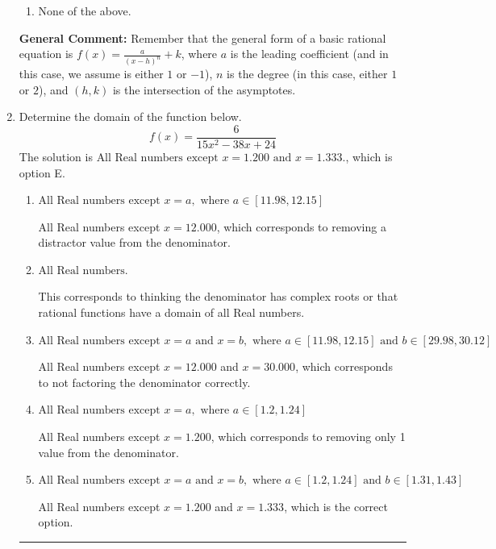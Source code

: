 \documentclass{extbook}[14pt]
\newcommand{\litem}[1]{\item #1

\rule{\textwidth}{0.4pt}}
\begin{document}
\begin{enumerate}
{\begin{enumerate}[label=\Alph*.]
\item None of the above.\end{enumerate}
\textbf{General Comment:} Remember that the general form of a basic rational equation is $ f(x) = \frac{a}{(x-h)^n} + k$, where $a$ is the leading coefficient (and in this case, we assume is either $1$ or $-1$), $n$ is the degree (in this case, either $1$ or $2$), and $(h, k)$ is the intersection of the asymptotes.
}
\litem{
Determine the domain of the function below.
\[ f(x) = \frac{6}{15x^{2} -38 x + 24} \]The solution is \( \text{All Real numbers except } x = 1.200 \text{ and } x = 1.333. \), which is option E.\begin{enumerate}[label=\Alph*.]
\item \( \text{All Real numbers except } x = a, \text{ where } a \in [11.98, 12.15] \)

All Real numbers except $x = 12.000$, which corresponds to removing a distractor value from the denominator.
\item \( \text{All Real numbers.} \)

This corresponds to thinking the denominator has complex roots or that rational functions have a domain of all Real numbers.
\item \( \text{All Real numbers except } x = a \text{ and } x = b, \text{ where } a \in [11.98, 12.15] \text{ and } b \in [29.98, 30.12] \)

All Real numbers except $x = 12.000$ and $x = 30.000$, which corresponds to not factoring the denominator correctly.
\item \( \text{All Real numbers except } x = a, \text{ where } a \in [1.2, 1.24] \)

All Real numbers except $x = 1.200$, which corresponds to removing only 1 value from the denominator.
\item \( \text{All Real numbers except } x = a \text{ and } x = b, \text{ where } a \in [1.2, 1.24] \text{ and } b \in [1.31, 1.43] \)

All Real numbers except $x = 1.200$ and $x = 1.333$, which is the correct option.
\end{enumerate}

}
\end{enumerate}
\end{document}
